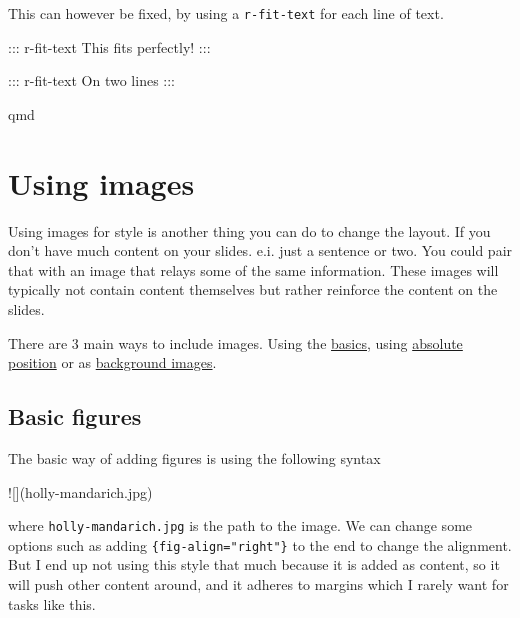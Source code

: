\documentclass[
  letterpaper,
  DIV=11,
  numbers=noendperiod]{scrreprt}
\newenvironment{Shaded}{\begin{snugshade}}{\end{snugshade}}
\newcommand{\AlertTok}[1]{\textcolor[rgb]{0.68,0.00,0.00}{#1}}
\newcommand{\NormalTok}[1]{\textcolor[rgb]{0.00,0.23,0.31}{#1}}
\begin{document}
This can however be fixed, by using a \texttt{r-fit-text} for each line
of text.

\begin{Shaded}
\begin{Highlighting}[]
\NormalTok{::: r{-}fit{-}text}
\NormalTok{This fits perfectly!}
\NormalTok{:::}

\NormalTok{::: r{-}fit{-}text}
\NormalTok{On two lines}
\NormalTok{:::}
\end{Highlighting}
\end{Shaded}

qmd

\section{Using images}\label{using-images}

Using images for style is another thing you can do to change the layout.
If you don't have much content on your slides. e.i. just a sentence or
two. You could pair that with an image that relays some of the same
information. These images will typically not contain content themselves
but rather reinforce the content on the slides.

There are 3 main ways to include images. Using the
\href{https://quarto.org/docs/authoring/figures.html}{basics}, using
\href{https://quarto.org/docs/presentations/revealjs/advanced.html\#absolute-position}{absolute
position} or as
\href{https://quarto.org/docs/presentations/revealjs/\#image-backgrounds}{background
images}.

\subsection{Basic figures}\label{basic-figures}

The basic way of adding figures is using the following syntax

\begin{Shaded}
\begin{Highlighting}[]
\AlertTok{![](holly{-}mandarich.jpg)}
\end{Highlighting}
\end{Shaded}

where \texttt{holly-mandarich.jpg} is the path to the image. We can
change some options such as adding \texttt{\{fig-align="right"\}} to the
end to change the alignment. But I end up not using this style that much
because it is added as content, so it will push other content around,
and it adheres to margins which I rarely want for tasks like this.
\end{document}
